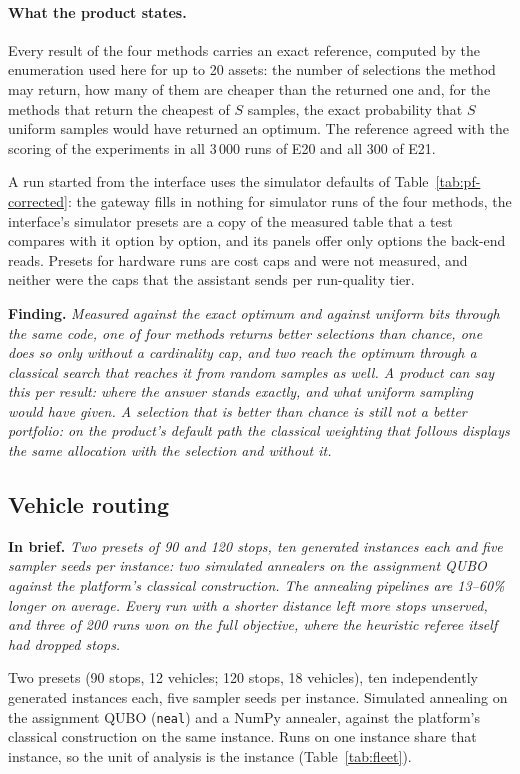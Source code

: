 \documentclass[11pt,a4paper]{article}
\newcommand{\finding}[1]{\par\smallskip\noindent\textbf{Finding.} \emph{#1}\par\smallskip}
\newcommand{\inbrief}[1]{\par\smallskip\noindent\textbf{In brief.} \emph{#1}\par\medskip}
\begin{document}
\paragraph{What the product states.} Every result of the four methods
carries an exact reference, computed by the enumeration used here for up to
20 assets: the number of selections the method may return, how many of them
are cheaper than the returned one and, for the methods that return the
cheapest of $S$ samples, the exact probability that $S$ uniform samples
would have returned an optimum. The reference agreed with the scoring of the
experiments in all 3\,000 runs of E20 and all 300 of E21.

A run started from the interface uses the simulator defaults of
Table~\ref{tab:pf-corrected}: the
gateway fills in nothing for simulator runs of the four methods, the
interface's simulator presets are a copy of the measured table that a test
compares with it option by option, and its panels offer only options the
back-end reads. Presets for
hardware runs are cost caps and were not measured, and neither were the
caps that the assistant sends per run-quality tier.

\finding{Measured against the exact optimum and
against uniform bits through the same code, one of four methods returns better selections
than chance, one does so only without a cardinality cap, and two reach the
optimum through a classical search that reaches it from random samples as
well. A product can say this per result: where the answer stands exactly,
and what uniform sampling would have given. A selection that is better than
chance is still not a better portfolio: on the product's default path the
classical weighting that follows displays the same allocation with the
selection and without it.}

\subsection{Vehicle routing}
\label{sec:res-fleet}

\inbrief{Two presets of 90 and 120 stops, ten generated instances each and
five sampler seeds per instance: two simulated annealers on the assignment
QUBO against the platform's classical construction. The annealing pipelines
are 13--60\% longer on average. Every run with a shorter distance left more
stops unserved, and three of 200 runs won on the full objective, where the
heuristic referee itself had dropped stops.}

Two presets (90 stops, 12 vehicles; 120 stops, 18 vehicles), ten
independently generated instances each, five sampler seeds per instance.
Simulated annealing on the assignment QUBO (\texttt{neal}) and a NumPy
annealer, against the platform's classical construction on the same
instance. Runs on one instance share that instance, so the unit of analysis
is the instance (Table~\ref{tab:fleet}).
\end{document}
